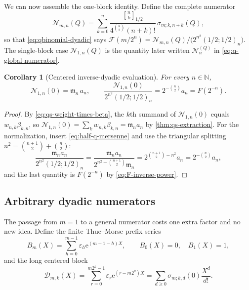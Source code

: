 \documentclass[11pt,oneside]{article}
\newtheorem{corollary}[theorem]{Corollary}
\theoremstyle{definition}
\theoremstyle{remark}
\newcommand{\N}{\mathbb N}
\newcommand{\e}{\mathrm e}
\newcommand{\qbinom}[3]{\genfrac{[}{]}{0pt}{}{#1}{#2}_{#3}}
\begin{document}
We can now assemble the one-block identity.  Define the complete numerator
\begin{equation}
 \mathcal N_{m,n}(Q)
 =\sum_{k=0}^{n}\frac{\qbinom nk{1/2}}{4^{\binom k2}(n+k)!}\,\sigma_{m;k,n+k}(Q), \label{eq:qs-numerator}
\end{equation}
so that \eqref{eq:qbinomial-dyadic} says
$\mathcal F(m/2^n)=\mathcal N_{m,n}(Q)/\bigl(2^{n^2}(1/2;1/2)_n\bigr)$.  The single-block
case $\mathcal N_{1,n}(Q)$ is the quantity later written $\mathcal N_n^{(Q)}$ in
\eqref{eq:q-global-numerator}.

\begin{corollary}[Centered inverse-dyadic evaluation]
\label{cor:qs-inverse-dyadic}
For every $n\in\N$,
\begin{equation}
 \mathcal N_{1,n}(0)=\mathfrak m_n\,a_n,
 \qquad
 \frac{\mathcal N_{1,n}(0)}{2^{n^2}(1/2;1/2)_n}=2^{-\binom n2}a_n=F(2^{-n}). \label{eq:qs-one-block}
\end{equation}
\end{corollary}

\begin{proof}
By \eqref{eq:qs-weight-times-beta}, the $k$th summand of $\mathcal N_{1,n}(0)$ equals
$w_{n,k}\beta_{k,n}$, so $\mathcal N_{1,n}(0)=\sum_kw_{n,k}\beta_{k,n}=\mathfrak m_na_n$ by
\cref{thm:qs-extraction}.  For the normalization, insert
\eqref{eq:half-q-mersenne} and use the triangular splitting
$n^2=\binom{n+1}2+\binom n2$:
\begin{equation*}
 \frac{\mathfrak m_na_n}{2^{n^2}(1/2;1/2)_n}
 =\frac{\mathfrak m_na_n}{2^{n^2-\binom{n+1}2}\mathfrak m_n}
 =2^{\binom{n+1}2-n^2}a_n=2^{-\binom n2}a_n,
\end{equation*}
and the last quantity is $F(2^{-n})$ by \eqref{eq:F-inverse-power}.
\end{proof}

\subsection{Arbitrary dyadic numerators}
\label{subsec:qs-numerators}

The passage from $m=1$ to a general numerator costs one extra factor and no new idea.  Define
the finite Thue--Morse prefix series
\begin{equation}
 B_m(X)=\sum_{h=0}^{m-1}\varepsilon_h\e^{(m-1-h)X},
 \qquad B_0(X)=0,\quad B_1(X)=1,                           \label{eq:qs-Bm-def}
\end{equation}
and the long centered block
\begin{equation}
 \mathscr D_{m,k}(X)=\sum_{r=0}^{m2^k-1}\varepsilon_r\e^{(r-m2^k)X}
 =\sum_{d\ge0}\sigma_{m;k,d}(0)\frac{X^d}{d!}.             \label{eq:qs-Dmk-def}
\end{equation}
\end{document}
